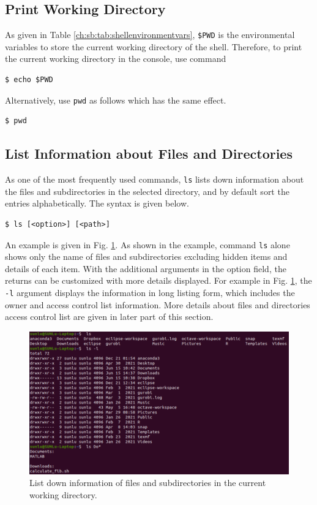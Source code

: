 \subsection{Print Working Directory}

As given in Table \ref{ch:sb:tab:shellenvironmentvars}, \verb|$PWD| is the environmental variables to store the current working directory of the shell. Therefore, to print the current working directory in the console, use command 
\begin{lstlisting}
$ echo $PWD
\end{lstlisting}
Alternatively, use \verb|pwd| as follows which has the same effect.
\begin{lstlisting}
$ pwd
\end{lstlisting}

\subsection{List Information about Files and Directories}

As one of the most frequently used commands, \verb|ls| lists down information about the files and subdirectories in the selected directory, and by default sort the entries alphabetically. The syntax is given below.
\begin{lstlisting}
$ ls [<option>] [<path>]
\end{lstlisting}

An example is given in Fig. \ref{ch:fm:fig:lscommandexample}. As shown in the example, command \verb|ls| alone shows only the name of files and subdirectories excluding hidden items and details of each item. With the additional arguments in the option field, the returns can be customized with more details displayed. For example in Fig. \ref{ch:fm:fig:lscommandexample}, the \verb|-l| argument displays the information in long listing form, which includes the owner and access control list information. More details about files and directories access control list are given in later part of this section.

\begin{figure}[!htb]
	\centering
	\includegraphics[width=350pt]{chapters/part-1/figures/ls_command_example.png}
	\caption{List down information of files and subdirectories in the current working directory.} \label{ch:fm:fig:lscommandexample}
\end{figure}

